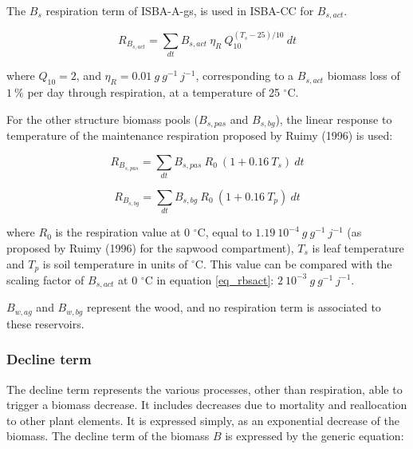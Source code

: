 {The $B_s$ respiration term of ISBA-A-gs, is used in ISBA-CC for $B_{s,act}$.

\begin{equation}
R_{B_{s,act}} = \sum_{dt} B_{s,act} \: \eta_R \: Q_{10}^{(T_s - 25)/10} \: dt
\label{eq_rbsact}
\end{equation}

where $Q_{10}=2$, and $\eta_R=0.01 \:g\:g^{-1}\:j^{-1}$, corresponding to a 
$B_{s,act}$ biomass loss of $1\:\%$ per day through respiration, at a
temperature of 25 $^{\circ}$C. 

For the other structure biomass pools ($B_{s,pas}$ and $B_{s,bg}$), the linear response to temperature 
of the maintenance respiration proposed by Ruimy \etal (1996)\nocite{Ruimy1996} is used:

\begin{equation}
R_{B_{s,pas}} = \sum_{dt} B_{s,pas} \: R_0 \: ( 1 + 0.16 \: T_s ) \: dt
\end{equation}

\begin{equation}
R_{B_{s,bg}} = \sum_{dt} B_{s,bg} \: R_0 \: ( 1 + 0.16 \: T_p ) \: dt
\end{equation}

where $R_0$ is the respiration value at 0 $^{\circ}$C, equal to $1.19 \: 10^{-4}
\:g\:g^{-1}\:j^{-1}$ (as proposed by Ruimy \etal (1996) for the sapwood compartment), 
$T_s$ is leaf temperature and $T_p$ is soil temperature in units of $^{\circ}$C. This value 
can be compared with the scaling factor of $B_{s,act}$ at  0 $^{\circ}$C in equation 
\ref{eq_rbsact}: $2 \: 10^{-3} \:g\:g^{-1}\:j^{-1}$.

$B_{w,ag}$ and $B_{w,bg}$ represent the wood, and no respiration term 
is associated to these reservoirs.



\subsubsection{Decline term}
\label{subs:isbacc_decl}

The decline term represents the various processes, other than respiration, able to trigger a biomass decrease. 
It includes decreases due to mortality and reallocation to other plant elements. 
It is expressed simply, as an exponential decrease of the biomass. 
The decline term of the biomass $B$ is expressed by the generic equation:

}
